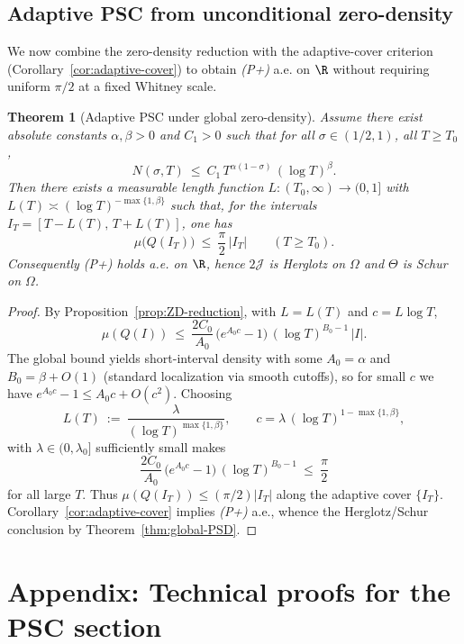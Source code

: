 \documentclass[11pt]{article}
\newtheorem{theorem}{Theorem}
\theoremstyle{remark}
\begin{document}
\subsection{Adaptive PSC from unconditional zero-density}\label{subsec:adaptive-psc-zd}
We now combine the zero-density reduction with the adaptive-cover criterion (Corollary~\ref{cor:adaptive-cover}) to obtain \emph{(P+)} a.e. on \(\R\) without requiring uniform \(\pi/2\) at a fixed Whitney scale.

\begin{theorem}[Adaptive PSC under global zero-density]
Assume there exist absolute constants \(\alpha,\beta>0\) and \(C_1>0\) such that for all \(\sigma\in(1/2,1)\), all \(T\ge T_0\),
\[
 N(\sigma,T)\ \le\ C_1\,T^{\alpha(1-\sigma)}\,(\log T)^{\beta}.
\]
Then there exists a measurable length function \(L:(T_0,\infty)\to(0,1] \) with \(L(T)\asymp (\log T)^{-\max\{1,\beta\}}\) such that, for the intervals \(I_T=[T-L(T),\,T+L(T)]\), one has
\[
 \mu\big(Q(I_T)\big)\ \le\ \frac{\pi}{2}\,|I_T|\qquad (T\ge T_0).
\]
Consequently \emph{(P+)} holds a.e. on \(\R\), hence \(2\mathcal J\) is Herglotz on \(\Omega\) and \(\Theta\) is Schur on \(\Omega\).
\end{theorem}
\begin{proof}
By Proposition~\ref{prop:ZD-reduction}, with \(L=L(T)\) and \(c=L\log T\),
\[\mu(Q(I))\ \le\ \frac{2C_0}{A_0}\,\big(e^{A_0 c}-1\big)\,(\log T)^{B_0-1}\,|I|.\]
The global bound yields short-interval density with some \(A_0=\alpha\) and \(B_0=\beta+O(1)\) (standard localization via smooth cutoffs), so for small \(c\) we have \(e^{A_0 c}-1\le A_0 c + O(c^2)\). Choosing
\[ L(T)\ :=\ \frac{\lambda}{(\log T)^{\max\{1,\beta\}}},\qquad c=\lambda\,(\log T)^{1-\max\{1,\beta\}},\]
with \(\lambda\in(0,\lambda_0]\) sufficiently small makes
\[ \frac{2C_0}{A_0}\,\big(e^{A_0 c}-1\big)\,(\log T)^{B_0-1}\ \le\ \frac{\pi}{2} \]
for all large \(T\). Thus \(\mu(Q(I_T))\le (\pi/2)|I_T|\) along the adaptive cover \(\{I_T\}\). Corollary~\ref{cor:adaptive-cover} implies \emph{(P+)} a.e., whence the Herglotz/Schur conclusion by Theorem~\ref{thm:global-PSD}.\qedhere
\end{proof}

\appendix
\section{Appendix: Technical proofs for the PSC section}\label{app:psc-tech}
\end{document}
